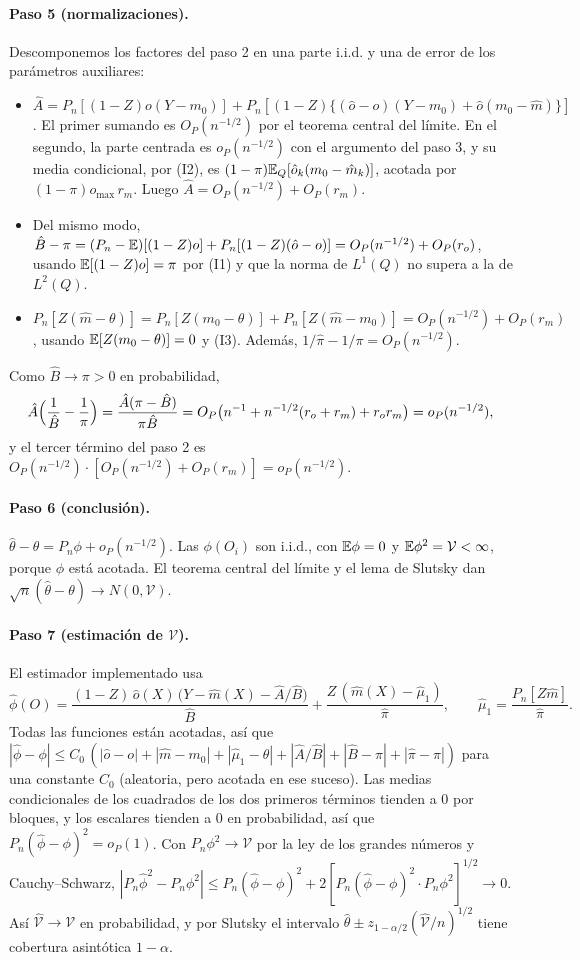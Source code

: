 \paragraph{Paso 5 (normalizaciones).} Descomponemos los factores del paso 2 en una parte i.i.d. y una de error de los parámetros auxiliares:
\begin{itemize}
  \item $\hat A=P_n[(1-Z)o(Y-m_0)]+P_n[(1-Z)\{(\hat o-o)(Y-m_0)+\hat o(m_0-\hat m)\}]$. El primer sumando es $O_P(n^{-1/2})$ por el teorema central del límite. En el segundo, la parte centrada es $o_P(n^{-1/2})$ con el argumento del paso 3, y su media condicional, por (I2), es $(1-\pi)\mathbb{E}_Q[\hat o_k(m_0-\hat m_k)]$, acotada por $(1-\pi)o_{\max}\,r_m$. Luego $\hat A=O_P(n^{-1/2})+O_P(r_m)$.
  \item Del mismo modo, $\hat B-\pi=(P_n-\mathbb{E})[(1-Z)o]+P_n[(1-Z)(\hat o-o)]=O_P(n^{-1/2})+O_P(r_o)$, usando $\mathbb{E}[(1-Z)o]=\pi$ por (I1) y que la norma de $L^1(Q)$ no supera a la de $L^2(Q)$.
  \item $P_n[Z(\hat m-\theta)]=P_n[Z(m_0-\theta)]+P_n[Z(\hat m-m_0)]=O_P(n^{-1/2})+O_P(r_m)$, usando $\mathbb{E}[Z(m_0-\theta)]=0$ y (I3). Además, $1/\hat\pi-1/\pi=O_P(n^{-1/2})$.
\end{itemize}
Como $\hat B\to\pi>0$ en probabilidad,
\[
\hat A\Bigl(\frac1{\hat B}-\frac1\pi\Bigr)=\frac{\hat A(\pi-\hat B)}{\pi\hat B}=O_P\bigl(n^{-1}+n^{-1/2}(r_o+r_m)+r_or_m\bigr)=o_P(n^{-1/2}),
\]
y el tercer término del paso 2 es $O_P(n^{-1/2})\cdot[O_P(n^{-1/2})+O_P(r_m)]=o_P(n^{-1/2})$.

\paragraph{Paso 6 (conclusión).} $\hat\theta-\theta=P_n\phi+o_P(n^{-1/2})$. Las $\phi(O_i)$ son i.i.d., con $\mathbb{E}\phi=0$ y $\mathbb{E}\phi^2=\mathcal V<\infty$, porque $\phi$ está acotada. El teorema central del límite y el lema de Slutsky dan $\sqrt n(\hat\theta-\theta)\to N(0,\mathcal V)$.

\paragraph{Paso 7 (estimación de $\mathcal V$).} El estimador implementado usa
\[
\hat\phi(O)=\frac{(1-Z)\,\hat o(X)\,\bigl(Y-\hat m(X)-\hat A/\hat B\bigr)}{\hat B}+\frac{Z\,(\hat m(X)-\hat\mu_1)}{\hat\pi},\qquad\hat\mu_1=\frac{P_n[Z\hat m]}{\hat\pi}.
\]
Todas las funciones están acotadas, así que $|\hat\phi-\phi|\le C_0\,(|\hat o-o|+|\hat m-m_0|+|\hat\mu_1-\theta|+|\hat A/\hat B|+|\hat B-\pi|+|\hat\pi-\pi|)$ para una constante $C_0$ (aleatoria, pero acotada en ese suceso). Las medias condicionales de los cuadrados de los dos primeros términos tienden a 0 por bloques, y los escalares tienden a 0 en probabilidad, así que $P_n(\hat\phi-\phi)^2=o_P(1)$. Con $P_n\phi^2\to \mathcal V$ por la ley de los grandes números y Cauchy--Schwarz, $|P_n\hat\phi^2-P_n\phi^2|\le P_n(\hat\phi-\phi)^2+2[P_n(\hat\phi-\phi)^2\cdot P_n\phi^2]^{1/2}\to0$. Así $\hat{\mathcal V}\to \mathcal V$ en probabilidad, y por Slutsky el intervalo $\hat\theta\pm z_{1-\alpha/2}(\hat{\mathcal V}/n)^{1/2}$ tiene cobertura asintótica $1-\alpha$.

